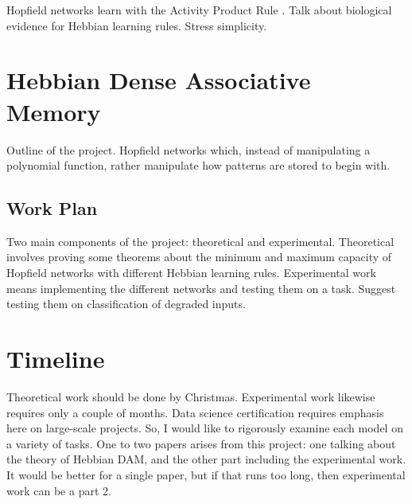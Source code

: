 \documentclass{article}
\theoremstyle{definition}
\begin{document}
Hopfield networks learn with the Activity Product Rule
\parencite{haykin_neural_2009}.
Talk about biological evidence for Hebbian learning rules. Stress simplicity.

\section{Hebbian Dense Associative Memory}\label{sec:hebbian-dam}

Outline of the project. Hopfield networks which, instead of
manipulating a polynomial
function, rather manipulate how patterns are stored to begin with.

\subsection{Work Plan}\label{sec:work-plan}

Two main components of the project: theoretical and experimental. Theoretical
involves proving some theorems about the minimum and maximum capacity of
Hopfield networks with different Hebbian learning rules. Experimental work
means implementing the different networks and testing them on a task. Suggest
testing them on classification of degraded inputs.

\section{Timeline}\label{sec:timeline}

Theoretical work should be done by Christmas. Experimental work likewise
requires only a couple of months. Data science certification requires emphasis
here on large-scale projects. So, I would like to rigorously examine
each model on a variety of tasks. One to two papers arises from this project:
one talking about the theory of Hebbian DAM, and the other part including
the experimental work. It would be better for a single paper, but if that
runs too long, then experimental work can be a part 2.

\printbibliography
\end{document}
